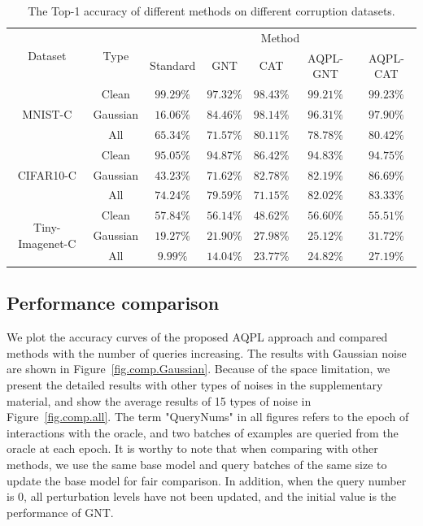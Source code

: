 \documentclass[letterpaper]{article} %
\begin{document}
\begin{table}[!t]
	\centering
	\begin{tabular}{c|c|ccccc}
		\hline
		\multirow{2}{*}{Dataset} & \multirow{2}{*}{Type}
		&\multicolumn{5}{c}{Method}\\
		\cline{3-7}
		&&Standard & GNT & CAT & AQPL-GNT & AQPL-CAT\\
		\hline
		\multirow{3}{*}{MNIST-C}
		& Clean & $\bm{99.29\%}$ & $97.32\%$ & $98.43\%$ & $99.21\%$ & $99.23\%$ \\
		& Gaussian & $16.06\%$ & $84.46\%$ & $\bm{98.14\%}$ & $96.31\%$ & $97.90\%$ \\
		& All & $65.34\%$ & $71.57\%$ & $80.11\%$ & $78.78\%$ & $\bm{80.42\%}$ \\
		\hline

		\multirow{3}{*}{CIFAR10-C}
		& Clean & $\bm{95.05\%}$ & $94.87\%$ & $86.42\%$ & $94.83\%$ & $94.75\%$ \\
		& Gaussian & $43.23\%$ & $71.62\%$ & $82.78\%$ & $82.19\%$ & $\bm{86.69\%}$ \\
		& All & $74.24\%$ & $79.59\%$ & $71.15\%$ & $82.02\%$ & $\bm{83.33\%}$ \\
		\hline

		\multirow{3}{*}{Tiny-Imagenet-C}
		& Clean & $\bm{57.84\%}$ & $56.14\%$ & $48.62\%$ & $56.60\%$ & $55.51\%$ \\
		& Gaussian & $19.27\%$ & $21.90\%$ & $27.98\%$ & $25.12\%$ & $\bm{31.72\%}$ \\
		& All & $9.99\%$ & $14.04\%$ & $23.77\%$ & $24.82\%$ & $\bm{27.19\%}$ \\

		\hline
	\end{tabular}
	\caption{The Top-1 accuracy of different methods on different corruption datasets.}
	\label{table:comparison}
\end{table}






\subsection{Performance comparison}
We plot the accuracy curves of the proposed AQPL approach and compared methods with the number of queries increasing. The results with Gaussian noise are shown in Figure~\ref{fig.comp.Gaussian}. Because of the space limitation, we present the detailed results with other types of noises in the supplementary material, and show the average results of 15 types of noise in Figure~\ref{fig.comp.all}. The term "QueryNums" in all figures refers to the epoch of interactions with the oracle, and two batches of examples are queried from the oracle at each epoch. It is worthy to note that when comparing with other methods, we use the same base model and query batches of the same size to update the base model for fair comparison. In addition, when the query number is $0$, all perturbation levels have not been updated, and the initial value is the performance of GNT.
\end{document}
